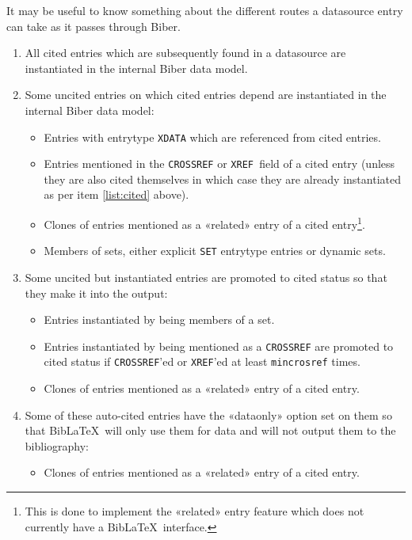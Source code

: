 \documentclass{ltxdockit}
\begin{document}
It may be useful to know something about the different routes a datasource
entry can take as it passes through Biber.

\begin{enumerate}
\item\label{list:cited} All cited entries which are subsequently found in a
  datasource are instantiated in the internal Biber data model.
\item Some uncited entries on which cited entries depend are
  instantiated in the internal Biber data model:
  \begin{itemize}
  \item Entries with entrytype \verb+XDATA+ which are referenced from cited
    entries.
    \item Entries mentioned in the \verb+CROSSREF+ or \verb+XREF +field of a cited entry
      (unless they are also cited themselves in which case they are already
      instantiated as per item \ref{list:cited} above).
      \item Clones of entries mentioned as a «related» entry of a cited
        entry\footnote{This is done to 
          implement the «related» entry feature which does not currently
          have a Bib\LaTeX\ interface.}.
      \item Members of sets, either explicit \verb+SET+ entrytype entries or
        dynamic sets.
  \end{itemize}
\item Some uncited but instantiated entries are promoted to cited
  status so that they make it into the output:
  \begin{itemize}
  \item Entries instantiated by being members of a set.
  \item Entries instantiated by being mentioned as a \verb+CROSSREF+ are
    promoted to cited status if \verb+CROSSREF+'ed or \verb+XREF+'ed at
    least \verb+mincrosref+ times.
  \item Clones of entries mentioned as a «related» entry of a cited entry.
  \end{itemize}
\item Some of these auto-cited entries have the «dataonly» option set on
  them so that Bib\LaTeX\ will only use them for data and will not output
  them to the bibliography:
  \begin{itemize}
  \item Clones of entries mentioned as a «related» entry of a cited entry.
  \end{itemize}
\end{enumerate}
\end{document}
